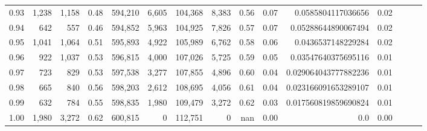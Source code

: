 \begin{tabular}{rrrrrrrrrrrrrrr}
0.93 &   1,238 &  1,158 &  0.48 &  594,210 &    6,605 &  104,368 &    8,383 &  0.56 &  0.07 &    0.0585804117036656 &      0.02 \\
0.94 &     642 &    557 &  0.46 &  594,852 &    5,963 &  104,925 &    7,826 &  0.57 &  0.07 &   0.05288644890067494 &      0.02 \\
0.95 &   1,041 &  1,064 &  0.51 &  595,893 &    4,922 &  105,989 &    6,762 &  0.58 &  0.06 &    0.0436537148229284 &      0.02 \\
0.96 &     922 &  1,037 &  0.53 &  596,815 &    4,000 &  107,026 &    5,725 &  0.59 &  0.05 &   0.03547640375695116 &      0.01 \\
0.97 &     723 &    829 &  0.53 &  597,538 &    3,277 &  107,855 &    4,896 &  0.60 &  0.04 &  0.029064043777882236 &      0.01 \\
0.98 &     665 &    840 &  0.56 &  598,203 &    2,612 &  108,695 &    4,056 &  0.61 &  0.04 &  0.023166091653289107 &      0.01 \\
0.99 &     632 &    784 &  0.55 &  598,835 &    1,980 &  109,479 &    3,272 &  0.62 &  0.03 &  0.017560819859690824 &      0.01 \\
1.00 &   1,980 &  3,272 &  0.62 &  600,815 &        0 &  112,751 &        0 &   nan &  0.00 &                   0.0 &      0.00 \\
\bottomrule
\end{tabular}
